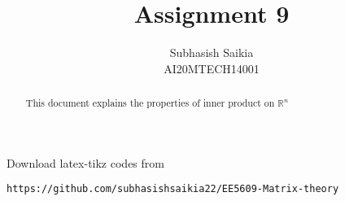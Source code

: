 \documentclass[journal,12pt]{IEEEtran}
\begin{document}
\onecolumn

\newtheorem{theorem}{Theorem}[section]
\newtheorem{problem}{Problem}
\newtheorem{proposition}{Proposition}[section]
\newtheorem{lemma}{Lemma}[section]
\newtheorem{corollary}[theorem]{Corollary}
\newtheorem{example}{Example}[section]
\newtheorem{definition}[problem]{Definition}

\newcommand{\BEQA}{\begin{eqnarray}}
\newcommand{\EEQA}{\end{eqnarray}}
\newcommand{\define}{\stackrel{\triangle}{=}}

\raggedbottom
\setlength{\parindent}{0pt}
\providecommand{\mbf}{\mathbf}
\providecommand{\pr}[1]{\ensuremath{\Pr\left(#1\right)}}
\providecommand{\qfunc}[1]{\ensuremath{Q\left(#1\right)}}
\providecommand{\sbrak}[1]{\ensuremath{{}\left[#1\right]}}
\providecommand{\lsbrak}[1]{\ensuremath{{}\left[#1\right.}}
\providecommand{\rsbrak}[1]{\ensuremath{{}\left.#1\right]}}
\providecommand{\brak}[1]{\ensuremath{\left(#1\right)}}
\providecommand{\lbrak}[1]{\ensuremath{\left(#1\right.}}
\providecommand{\rbrak}[1]{\ensuremath{\left.#1\right)}}
\providecommand{\cbrak}[1]{\ensuremath{\left\{#1\right\}}}
\providecommand{\lcbrak}[1]{\ensuremath{\left\{#1\right.}}
\providecommand{\rcbrak}[1]{\ensuremath{\left.#1\right\}}}
\theoremstyle{remark}
\newtheorem{rem}{Remark}
\newcommand{\sgn}{\mathop{\mathrm{sgn}}}
\providecommand{\system}{\overset{\mathcal{H}}{ \longleftrightarrow}}
\newcommand{\solution}{\noindent \textbf{Solution: }}
\newcommand{\cosec}{\,\text{cosec}\,}
\providecommand{\dec}[2]{\ensuremath{\overset{#1}{\underset{#2}{\gtrless}}}}
\newcommand{\myvec}[1]{\ensuremath{\begin{pmatrix}#1\end{pmatrix}}}
\newcommand{\mydet}[1]{\ensuremath{\begin{vmatrix}#1\end{vmatrix}}}
\makeatletter
{}
\makeatother
\let\StandardTheFigure\thefigure
\let\vec\mathbf
\renewcommand{\thefigure}{\theproblem}
\def\putbox#1#2#3{\makebox[0in][l]{\makebox[#1][l]{}\raisebox{\baselineskip}[0in][0in]{\raisebox{#2}[0in][0in]{#3}}}}
     \def\rightbox#1{\makebox[0in][r]{#1}}
     \def\centbox#1{\makebox[0in]{#1}}
     \def\topbox#1{\raisebox{-\baselineskip}[0in][0in]{#1}}
     \def\midbox#1{\raisebox{-0.5\baselineskip}[0in][0in]{#1}}
\vspace{3cm}
\title{Assignment 9}
\author{Subhasish Saikia\\AI20MTECH14001}
\maketitle
\begin{abstract}
This document explains the properties of inner product on $\mathbb{R}^{n}$
\end{abstract}
\bigskip
\renewcommand{\thefigure}{\theenumi}
\renewcommand{\thetable}{\theenumi}
Download latex-tikz codes from
\begin{lstlisting}
https://github.com/subhasishsaikia22/EE5609-Matrix-theory
\end{lstlisting}
\end{document}
